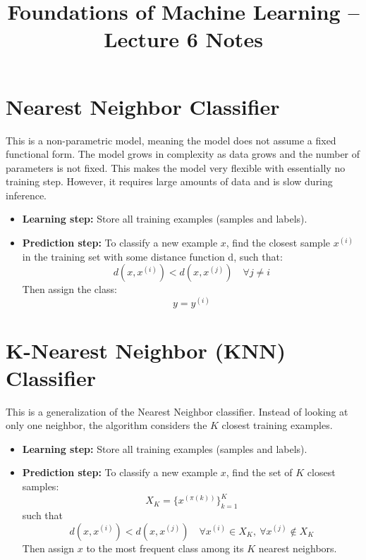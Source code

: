 \documentclass[11pt]{article}
\title{Foundations of Machine Learning -- Lecture 6 Notes}
\author{}
\date{}
\begin{document}
\maketitle

\section*{Nearest Neighbor Classifier}
This is a non-parametric model, meaning the model does not assume a fixed functional form.  
The model grows in complexity as data grows and the number of parameters is not fixed.  
This makes the model very flexible with essentially no training step.  
However, it requires large amounts of data and is slow during inference.

\begin{itemize}
    \item \textbf{Learning step:} Store all training examples (samples and labels).
    \item \textbf{Prediction step:} To classify a new example $x$, find the closest sample $x^{(i)}$ in the training set with some distance function d, such that:
    \[
        d(x, x^{(i)}) < d(x, x^{(j)}) \quad \forall j \neq i
    \]
    Then assign the class:
    \[
        y = y^{(i)}
    \]
\end{itemize}

\section*{K-Nearest Neighbor (KNN) Classifier}
This is a generalization of the Nearest Neighbor classifier.  
Instead of looking at only one neighbor, the algorithm considers the $K$ closest training examples.

\begin{itemize}
    \item \textbf{Learning step:} Store all training examples (samples and labels).
    \item \textbf{Prediction step:} To classify a new example $x$, find the set of $K$ closest samples:
    \[
        X_K = \{ x^{(\pi(k))} \}_{k=1}^K
    \]
    such that
    \[
        d(x, x^{(i)}) < d(x, x^{(j)}) \quad \forall x^{(i)} \in X_K, \ \forall x^{(j)} \notin X_K
    \]
    Then assign $x$ to the most frequent class among its $K$ nearest neighbors.
\end{itemize}
\end{document}
